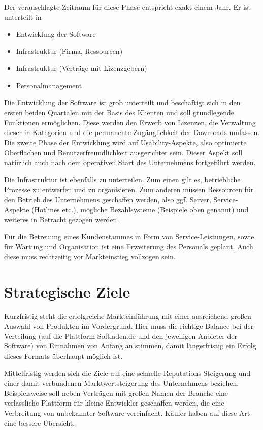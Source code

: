 Der veranschlagte Zeitraum für diese Phase entspricht exakt einem Jahr. Er ist unterteilt in

\begin{itemize}
	\item Entwicklung der Software
	\item Infrastruktur (Firma, Ressourcen)
	\item Infrastruktur (Verträge mit Lizenzgebern)
	\item Personalmanagement
\end{itemize}

Die Entwicklung der Software ist grob unterteilt und beschäftigt sich in den ersten beiden Quartalen mit der Basis des Klienten und soll grundlegende Funktionen ermöglichen. Diese werden den Erwerb von Lizenzen, die Verwaltung dieser in Kategorien und die permanente Zugänglichkeit der Downloads umfassen. Die zweite Phase der Entwicklung wird auf Usability-Aspekte, also optimierte Oberflächen und Benutzerfreundlichkeit ausgerichtet sein. Dieser Aspekt soll natürlich auch nach dem operativen Start des Unternehmens fortgeführt werden.

Die Infrastruktur ist ebenfalls zu unterteilen. Zum einen gilt es, betriebliche Prozesse zu entwerfen und zu organisieren. Zum anderen müssen Ressourcen für den Betrieb des Unternehmens geschaffen werden, also ggf. Server, Service-Aspekte (Hotlines etc.), mögliche Bezahlsysteme (Beispiele oben genannt) und weiteres in Betracht gezogen werden. 

Für die Betreuung eines Kundenstammes in Form von Service-Leistungen, sowie für Wartung und Organisation ist eine Erweiterung des Personals geplant. Auch diese muss rechtzeitig vor Markteinstieg vollzogen sein.

\section{Strategische Ziele}

Kurzfristig steht die erfolgreiche Markteinführung mit einer ausreichend großen Auswahl von Produkten im Vordergrund. Hier muss die richtige Balance bei der Verteilung (auf die Plattform Softladen.de und den jeweiligen Anbieter der Software) von Einnahmen von Anfang an stimmen, damit längerfristig ein Erfolg dieses Formats überhaupt möglich ist. 

Mittelfristig werden sich die Ziele auf eine schnelle Reputations-Steigerung und einer damit verbundenen Marktwertsteigerung des Unternehmens beziehen. Beispielsweise soll neben Verträgen mit großen Namen der Branche eine verlässliche Plattform für kleine Entwickler geschaffen werden, die eine Verbreitung von unbekannter Software vereinfacht. Käufer haben auf diese Art eine bessere Übersicht.

